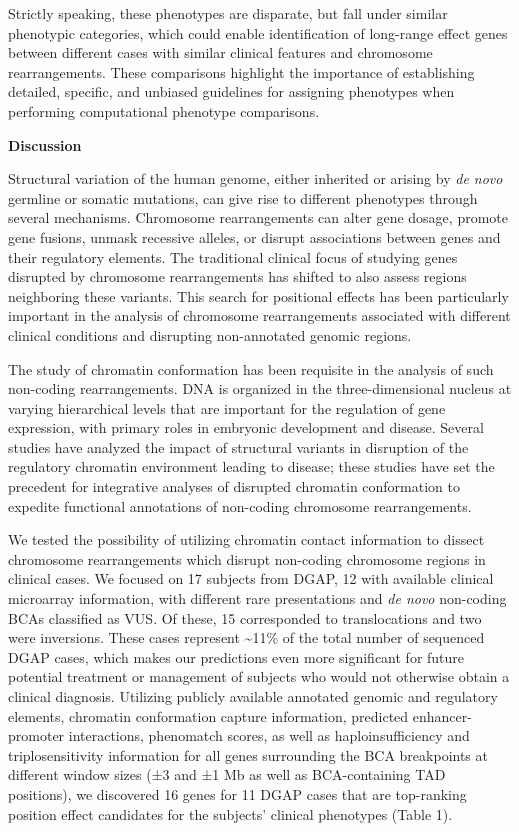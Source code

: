 \documentclass[a4paper,twoside=true,openright,parskip=full,chapterprefix=true,11pt,headings=normal,bibliography=totoc,listof=totoc,titlepage=on,captions=tableabove,draft=false]{scrreprt}
\theoremstyle{definition}
\theoremstyle{definition}
\theoremstyle{definition}
\theoremstyle{remark}
\begin{document}
Strictly speaking, these phenotypes are disparate, but fall under
similar phenotypic categories, which could enable identification of
long-range effect genes between different cases with similar clinical
features and chromosome rearrangements. These comparisons highlight the
importance of establishing detailed, specific, and unbiased guidelines
for assigning phenotypes when performing computational phenotype
comparisons.

\textbf{Discussion}

Structural variation of the human genome, either inherited or arising by
\emph{de novo} germline or somatic mutations, can give rise to different
phenotypes through several mechanisms. Chromosome rearrangements can
alter gene dosage, promote gene fusions, unmask recessive alleles, or
disrupt associations between genes and their regulatory elements. The
traditional clinical focus of studying genes disrupted by chromosome
rearrangements has shifted to also assess regions neighboring these
variants.\citep{Ordulu2016} This search for positional effects has been
particularly important in the analysis of chromosome rearrangements
associated with different clinical conditions and disrupting
non-annotated genomic regions.\citep{Zhang2015, Spielmann2016}

The study of chromatin conformation has been requisite in the analysis
of such non-coding rearrangements. DNA is organized in the
three-dimensional nucleus at varying hierarchical levels that are
important for the regulation of gene expression,\citep{DeWit2012} with
primary roles in embryonic development and disease.\citep{Bonev2016}
Several studies have analyzed the impact of structural variants in
disruption of the regulatory chromatin environment leading to
disease;\citep{Lupianez2015, Groschel2014, Visser2012, Roussos2014, Ibn-Salem2014}
these studies have set the precedent for integrative analyses of
disrupted chromatin conformation to expedite functional annotations of
non-coding chromosome rearrangements.

We tested the possibility of utilizing chromatin contact information to
dissect chromosome rearrangements which disrupt non-coding chromosome
regions in clinical cases. We focused on 17 subjects from DGAP, 12 with
available clinical microarray information, with different rare
presentations and \emph{de novo} non-coding BCAs classified as VUS. Of
these, 15 corresponded to translocations and two were inversions. These
cases represent \textasciitilde{}11\% of the total number of sequenced
DGAP cases, which makes our predictions even more significant for future
potential treatment or management of subjects who would not otherwise
obtain a clinical diagnosis. Utilizing publicly available annotated
genomic and regulatory elements, chromatin conformation capture
information, predicted enhancer-promoter interactions, phenomatch
scores, as well as haploinsufficiency and triplosensitivity information
for all genes surrounding the BCA breakpoints at different window sizes
(±3 and ±1 Mb as well as BCA-containing TAD positions), we discovered 16
genes for 11 DGAP cases that are top-ranking position effect candidates
for the subjects' clinical phenotypes (Table 1).
\end{document}
